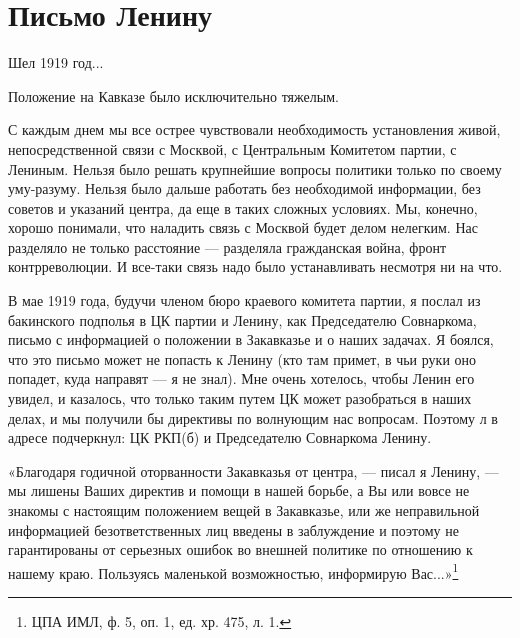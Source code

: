 \documentclass[12pt, a4paper, openany]{book}
\begin{document}
\newpage
	\section[Письмо Ленину]{\center \textbf{Письмо Ленину}}


Шел 1919 год...

Положение на Кавказе было исключительно тяжелым.

С каждым днем мы все острее чувствовали необходимость установления живой, непосредственной связи с Москвой, с Центральным Комитетом партии, с Лениным. Нельзя было решать крупнейшие вопросы политики только по своему уму-разуму. Нельзя было дальше работать без необходимой информации, без советов и указаний центра, да еще в таких сложных условиях. Мы, конечно, хорошо понимали, что наладить связь с Москвой будет делом нелегким. Нас разделяло не только расстояние — разделяла гражданская война, фронт контрреволюции. И все-таки связь надо было устанавливать несмотря ни на что.

В мае 1919 года, будучи членом бюро краевого комитета партии, я послал из бакинского подполья в ЦК партии и Ленину, как Председателю Совнаркома, письмо с информацией о положении в Закавказье и о наших задачах. Я боялся, что это письмо может не попасть к Ленину (кто там примет, в чьи руки оно попадет, куда направят — я не знал). Мне очень хотелось, чтобы Ленин его увидел, и казалось, что только таким путем ЦК может разобраться в наших делах, и мы получили бы директивы по волнующим нас вопросам. Поэтому л в адресе подчеркнул: ЦК РКП(б) и Председателю Совнаркома Ленину.

«Благодаря годичной оторванности Закавказья от центра, — писал я Ленину, — мы лишены Ваших директив и помощи в нашей борьбе, а Вы или вовсе не знакомы с настоящим положением вещей в Закавказье, или же неправильной информацией безответственных лиц введены в заблуждение и поэтому не гарантированы от серьезных ошибок во внешней политике по отношению к нашему краю. Пользуясь маленькой возможностью, информирую Вас...»\footnote{ЦПА ИМЛ, ф. 5, оп. 1, ед. хр. 475, л. 1.}
\end{document}
